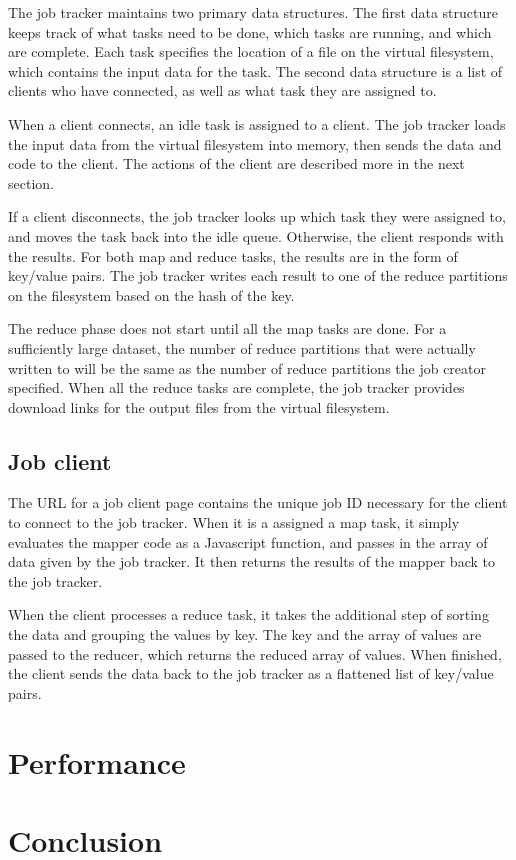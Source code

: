 \documentclass{article} %
\begin{document}
The job tracker maintains two primary data structures. The first data structure
keeps track of what tasks need to be done, which tasks are running, and which
are complete. Each task specifies the location of a file on the virtual
filesystem, which contains the input data for the task. The second data
structure is a list of clients who have connected, as well as what task they
are assigned to.

When a client connects, an idle task is assigned to a client. The job tracker
loads the input data from the virtual filesystem into memory, then sends the
data and code to the client. The actions of the client are described more in the
next section.

If a client disconnects, the job tracker looks up which task they were assigned
to, and moves the task back into the idle queue. Otherwise, the client responds
with the results. For both map and reduce tasks, the results are in the form of
key/value pairs. The job tracker writes each result to one of the reduce
partitions on the filesystem based on the hash of the key.

The reduce phase does not start until all the map tasks are done. For a
sufficiently large dataset, the number of reduce partitions that were actually
written to will be the same as the number of reduce partitions the job creator
specified. When all the reduce tasks are complete, the job tracker provides
download links for the output files from the virtual filesystem.

\subsection{Job client}
The URL for a job client page contains the unique job ID necessary for the
client to connect to the job tracker. When it is a assigned a map task, it
simply evaluates the mapper code as a Javascript function, and passes in the
array of data given by the job tracker. It then returns the results of the
mapper back to the job tracker.

When the client processes a reduce task, it takes the additional step of sorting
the data and grouping the values by key. The key and the array of values are
passed to the reducer, which returns the reduced array of values. When finished,
the client sends the data back to the job tracker as a flattened list of
key/value pairs.

\section{Performance}

\section{Conclusion}



\end{document}
